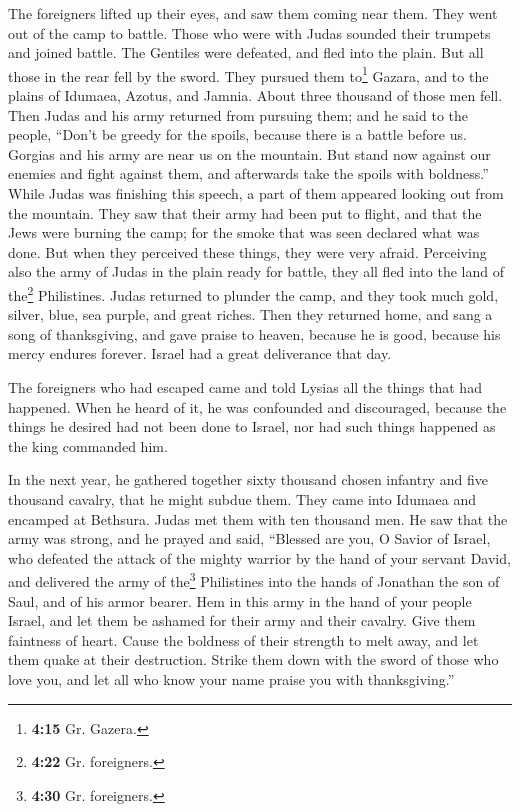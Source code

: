  The foreigners lifted up their eyes, and saw them coming
near them.  They went out of the camp to battle. Those
who were with Judas sounded their trumpets  and joined
battle. The Gentiles were defeated, and fled into the plain.
 But all those in the rear fell by the sword. They
pursued them to\footnote{\textbf{4:15} Gr. Gazera.} Gazara, and to the
plains of Idumaea, Azotus, and Jamnia. About three thousand of those men
fell.  Then Judas and his army returned from pursuing
them;  and he said to the people, ``Don't be greedy for
the spoils, because there is a battle before us.  Gorgias
and his army are near us on the mountain. But stand now against our
enemies and fight against them, and afterwards take the spoils with
boldness.''  While Judas was finishing this speech, a
part of them appeared looking out from the mountain. 
They saw that their army had been put to flight, and that the Jews were
burning the camp; for the smoke that was seen declared what was done.
 But when they perceived these things, they were very
afraid. Perceiving also the army of Judas in the plain ready for battle,
 they all fled into the land of the\footnote{\textbf{4:22}
  Gr. foreigners.} Philistines.  Judas returned to
plunder the camp, and they took much gold, silver, blue, sea purple, and
great riches.  Then they returned home, and sang a song
of thanksgiving, and gave praise to heaven, because he is good, because
his mercy endures forever.  Israel had a great
deliverance that day.

 The foreigners who had escaped came and told Lysias all
the things that had happened.  When he heard of it, he
was confounded and discouraged, because the things he desired had not
been done to Israel, nor had such things happened as the king commanded
him.

 In the next year, he gathered together sixty thousand
chosen infantry and five thousand cavalry, that he might subdue them.
 They came into Idumaea and encamped at Bethsura. Judas
met them with ten thousand men.  He saw that the army was
strong, and he prayed and said, ``Blessed are you, O Savior of Israel,
who defeated the attack of the mighty warrior by the hand of your
servant David, and delivered the army of the\footnote{\textbf{4:30} Gr.
  foreigners.} Philistines into the hands of Jonathan the son of Saul,
and of his armor bearer.  Hem in this army in the hand of
your people Israel, and let them be ashamed for their army and their
cavalry.  Give them faintness of heart. Cause the
boldness of their strength to melt away, and let them quake at their
destruction.  Strike them down with the sword of those
who love you, and let all who know your name praise you with
thanksgiving.''

